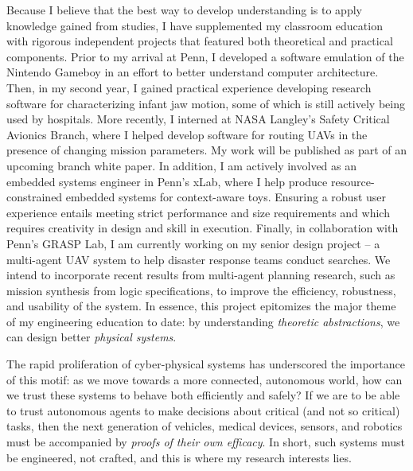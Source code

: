\documentclass[]{letter}
\begin{document}
Because I believe that the best way to develop understanding is to apply knowledge gained from studies, I have supplemented my classroom education with rigorous independent projects that featured both theoretical and practical components. Prior to my arrival at Penn, I developed a software emulation of the Nintendo Gameboy in an effort to better understand computer architecture. Then, in my second year, I gained practical experience developing research software for characterizing infant jaw motion, some of which is still actively being used by hospitals. More recently, I interned at NASA Langley's Safety Critical Avionics Branch, where I helped develop software for routing UAVs in the presence of changing mission parameters. My work will be published as part of an upcoming branch white paper. In addition, I am actively involved as an embedded systems engineer in Penn’s xLab, where I help produce resource-constrained embedded systems for context-aware toys.  Ensuring a robust user experience entails meeting strict performance and size requirements and which requires creativity in design and skill in execution. Finally, in collaboration with Penn's GRASP Lab, I am currently working on my senior design project -- a multi-agent UAV system to help disaster response teams conduct searches. We intend to incorporate recent results from multi-agent planning research, such as mission synthesis from logic specifications, to improve the efficiency, robustness, and usability of the system. In essence, this project epitomizes the major theme of my engineering education to date: by understanding \emph{theoretic abstractions}, we can design better \emph{physical systems}.

The rapid proliferation of cyber-physical systems has underscored the importance of this motif: as we move towards a more connected, autonomous world, how can we trust these systems to behave both efficiently and safely? If we are to be able to trust autonomous agents to make decisions about critical (and not so critical) tasks, then the next generation of vehicles, medical devices, sensors, and robotics must be accompanied by \emph{proofs of their own efficacy}. In short, such systems must be engineered, not crafted, and this is where my research interests lies.
\end{document}
